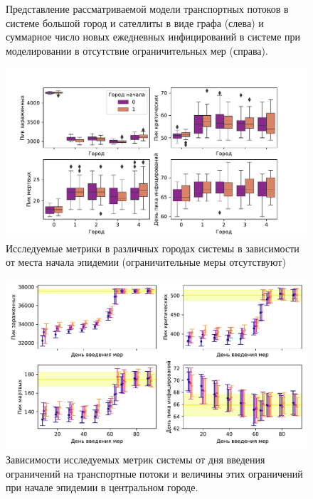 \documentclass[a4paper,12pt]{article} %
\begin{document}
\begin{figure}[H]
\begin{subfigure}{0.5\linewidth}
    \end{subfigure}
    \caption{Представление рассматриваемой модели транспортных потоков в системе большой город и сателлиты в виде графа (слева) и суммарное число новых ежедневных инфицирований в системе при моделировании в отсутствие ограничительных мер (справа).}
\end{figure}

\begin{figure}[H]
    \centering
    \includegraphics[width=\linewidth]{images/boxs.pdf}
    \caption{Исследуемые метрики в различных городах системы в зависимости от места начала эпидемии (ограничительные меры отсутствуют)}
\end{figure}

\begin{figure}[H]
    \centering
    \includegraphics[width=\linewidth]{images/hists.pdf}
    \caption{Зависимости исследуемых метрик системы от дня введения ограничений на транспортные потоки и величины этих ограничений при начале эпидемии в центральном городе.}
\end{figure}
\end{document}
